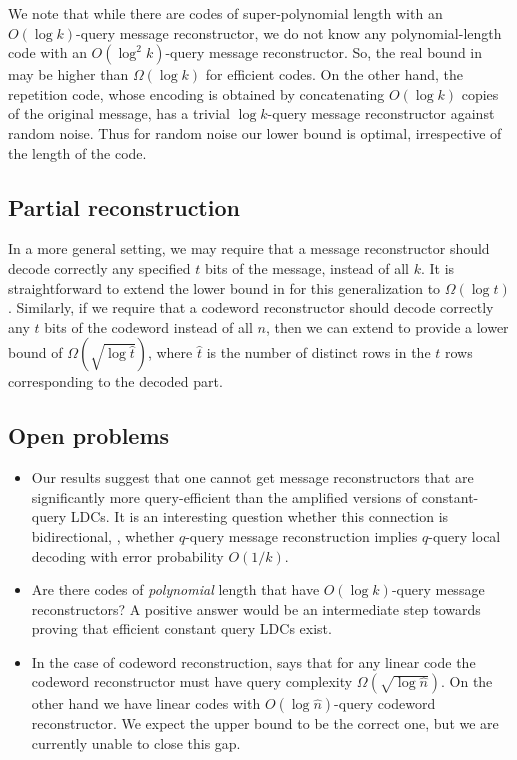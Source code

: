 We note that while there are codes of super-polynomial length with an $O(\log k)$-query message reconstructor,
we do not know any polynomial-length code with an $O(\log^2 k)$-query message reconstructor. So, the real bound in  may be  higher than $\Omega(\log k)$ for efficient codes. On the other hand, the repetition code, whose encoding is obtained by
concatenating $O(\log k)$ copies of the original message, has a trivial $\log k$-query message reconstructor against random noise. Thus
for random noise our lower bound is optimal, irrespective of the length of the code.

\subsection{Partial reconstruction}
In a more general setting, we may require that a message reconstructor should decode correctly any specified $t$ bits of the message, instead of all $k$. It is straightforward to extend the lower bound in  for this generalization to $\Omega( \log t)$. Similarly, if we require that a codeword reconstructor should decode correctly any $t$ bits of the codeword instead of all $n$, then we can extend   to provide a lower bound of $\Omega(\sqrt{\log \hat{t}})$, where $\hat{t}$ is the number of distinct rows in the $t$ rows corresponding to the decoded part.

\subsection{Open problems}
\begin{itemize}
\item Our results suggest that one cannot get message reconstructors that are significantly more query-efficient than the amplified versions of constant-query LDCs. It is an interesting question whether this connection is bidirectional, \ie, whether $q$-query message reconstruction implies $q$-query local decoding with error probability $O(1/k)$.

\item  Are there codes of \emph{polynomial} length that have $O(\log k)$-query message
reconstructors? A positive answer would be an intermediate step towards proving that efficient constant query LDCs exist.

\item In the case of codeword reconstruction,  says that
for any linear code the codeword reconstructor must have query
complexity $\Omega(\sqrt{\log \hat{n}})$. On the other hand we have linear
codes with $O(\log \hat{n})$-query codeword reconstructor. We expect the
upper bound to be the correct one, but we are currently unable to close this gap.

%
%
%
%

\end{itemize}


